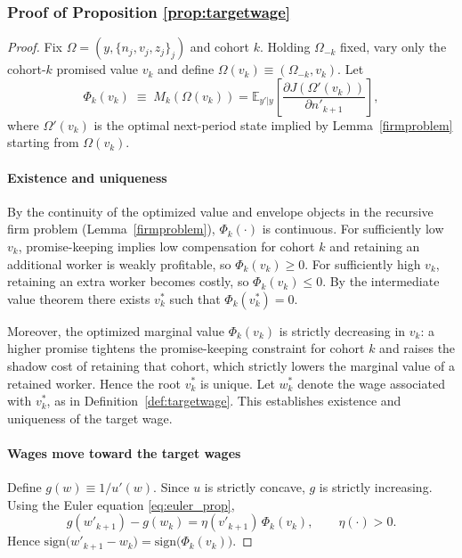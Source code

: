\subsubsection*{Proof of Proposition \ref{prop:targetwage}} \label{proof:targetwage}
\begin{proof}
Fix $\Omega=(y,\{n_j,v_j,z_j\}_j)$ and cohort $k$. Holding $\Omega_{-k}$ fixed, vary only the cohort-$k$ promised value $v_k$ and
define $\Omega(v_k)\equiv (\Omega_{-k},v_k)$. Let
\begin{equation}\label{eq:Phi_def_C}
\Phi_k(v_k)\;\equiv\;M_k(\Omega(v_k))
=
\mathbb E_{y'|y}\left[\frac{\partial J(\Omega'(v_k))}{\partial n'_{k+1}}\right],
\end{equation}
where $\Omega'(v_k)$ is the optimal next-period state implied by Lemma~\ref{firmproblem} starting from $\Omega(v_k)$.

\medskip\noindent
\paragraph{Existence and uniqueness}
By the continuity of the optimized value and envelope objects in the recursive firm problem (Lemma~\ref{firmproblem}),
$\Phi_k(\cdot)$ is continuous. For sufficiently low $v_k$, promise-keeping implies low compensation for cohort $k$ and retaining an
additional worker is weakly profitable, so $\Phi_k(v_k)\ge 0$. For sufficiently high $v_k$, retaining an extra worker becomes costly,
so $\Phi_k(v_k)\le 0$. By the intermediate value theorem there exists $v_k^*$ such that $\Phi_k(v_k^*)=0$.

Moreover, the optimized marginal value $\Phi_k(v_k)$ is strictly decreasing in $v_k$:
a higher promise tightens the promise-keeping constraint for cohort $k$ and raises the shadow cost of retaining that cohort,
which strictly lowers the marginal value of a retained worker. Hence the root $v_k^*$ is unique.
Let $w_k^*$ denote the wage associated with $v_k^*$, as in Definition~\ref{def:targetwage}.
This establishes existence and uniqueness of the target wage.

\medskip\noindent
\paragraph{Wages move toward the target wages}
Define $g(w)\equiv 1/u'(w)$. Since $u$ is strictly concave, $g$ is strictly increasing.
Using the Euler equation \eqref{eq:euler_prop},
\[
g(w'_{k+1})-g(w_k)=\eta(v'_{k+1})\,\Phi_k(v_k),
\qquad \eta(\cdot)>0.
\]
Hence $\mathrm{sign}\big(w'_{k+1}-w_k\big)=\mathrm{sign}\big(\Phi_k(v_k)\big)$.


\end{proof}
